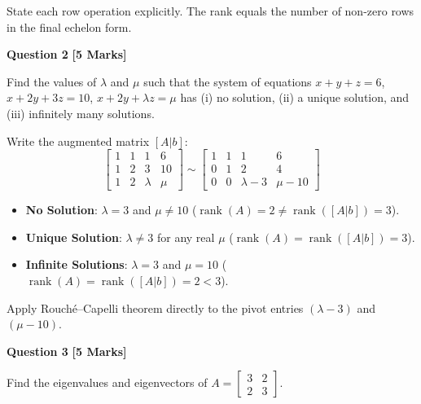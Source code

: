 \begin{examinertip}
State each row operation explicitly. The rank equals the number of non-zero rows in the final echelon form.
\end{examinertip}

\vspace{4mm}

\noindent\textbf{Question 2} \hfill \textbf{[5 Marks]}

Find the values of $\lambda$ and $\mu$ such that the system of equations $x+y+z=6$, $x+2y+3z=10$, $x+2y+\lambda z=\mu$ has (i) no solution, (ii) a unique solution, and (iii) infinitely many solutions.

\begin{solbox}
Write the augmented matrix $[A|b]$:
\begin{equation}
\begin{bmatrix} 1 & 1 & 1 & 6 \\ 1 & 2 & 3 & 10 \\ 1 & 2 & \lambda & \mu \end{bmatrix} \sim \begin{bmatrix} 1 & 1 & 1 & 6 \\ 0 & 1 & 2 & 4 \\ 0 & 0 & \lambda-3 & \mu-10 \end{bmatrix}
\end{equation}
\begin{itemize}
    \item \textbf{No Solution}: $\lambda = 3$ and $\mu \ne 10$ ($\operatorname{rank}(A)=2 \ne \operatorname{rank}([A|b])=3$).
    \item \textbf{Unique Solution}: $\lambda \ne 3$ for any real $\mu$ ($\operatorname{rank}(A)=\operatorname{rank}([A|b])=3$).
    \item \textbf{Infinite Solutions}: $\lambda = 3$ and $\mu = 10$ ($\operatorname{rank}(A)=\operatorname{rank}([A|b])=2 < 3$).
\end{itemize}
\end{solbox}

\begin{examinertip}
Apply Rouch\'e--Capelli theorem directly to the pivot entries $(\lambda-3)$ and $(\mu-10)$.
\end{examinertip}

\vspace{4mm}

\noindent\textbf{Question 3} \hfill \textbf{[5 Marks]}

Find the eigenvalues and eigenvectors of $A = \begin{bmatrix} 3 & 2 \\ 2 & 3 \end{bmatrix}$.

